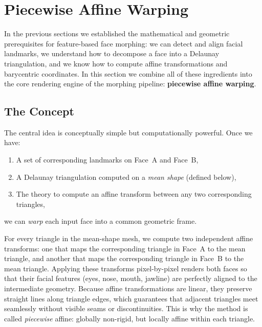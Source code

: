 \section{Piecewise Affine Warping}

In the previous sections we established the mathematical and geometric prerequisites for feature-based face morphing: we can detect and align facial landmarks, we understand how to decompose a face into a Delaunay triangulation, and we know how to compute affine transformations and barycentric coordinates. In this section we combine all of these ingredients into the core rendering engine of the morphing pipeline: \textbf{piecewise affine warping}.

\subsection{The Concept}

The central idea is conceptually simple but computationally powerful. Once we have:
\begin{enumerate}
    \item A set of corresponding landmarks on Face~A and Face~B,
    \item A Delaunay triangulation computed on a \emph{mean shape} (defined below),
    \item The theory to compute an affine transform between any two corresponding triangles,
\end{enumerate}
we can \emph{warp} each input face into a common geometric frame.

For every triangle in the mean-shape mesh, we compute two independent affine transforms: one that maps the corresponding triangle in Face~A to the mean triangle, and another that maps the corresponding triangle in Face~B to the mean triangle. Applying these transforms pixel-by-pixel renders both faces so that their facial features (eyes, nose, mouth, jawline) are perfectly aligned to the intermediate geometry. Because affine transformations are linear, they preserve straight lines along triangle edges, which guarantees that adjacent triangles meet seamlessly without visible seams or discontinuities. This is why the method is called \emph{piecewise} affine: globally non-rigid, but locally affine within each triangle.

